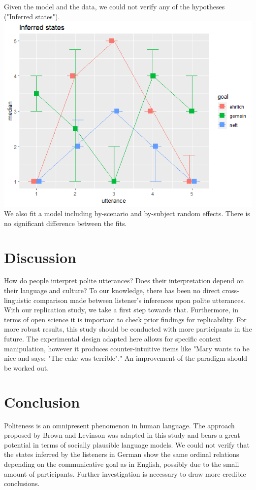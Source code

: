 \documentclass[a4paper,11pt]{article}
\begin{document}
Given the model and the data, we could not verify any of the hypotheses ("Inferred states").
\\
\includegraphics[width=15cm]{final_report/inferred-states.png} 
\\
We also fit a model including by-scenario and by-subject random effects. There is no significant difference between the fits.

\section{Discussion}
How do people interpret polite utterances? Does their interpretation depend on their language and culture? To our knowledge, there has been no direct cross-linguistic comparison made between listener's inferences upon polite utterances. With our replication study, we take a first step towards that. Furthermore, in terms of open science it is important to check prior findings for replicability. For more robust results, this study should be conducted with more participants in the future. The experimental design adapted here allows for specific context manipulation, however it produces counter-intuitive items like "Mary wants to be nice and says: "The cake was terrible"." An improvement of the paradigm should be worked out. 
\section{Conclusion}
Politeness is an omnipresent phenomenon in human language. The approach proposed by Brown and Levinson \cite{brown1987politeness} was adapted in this study and bears a great potential in terms of socially plausible language models. We could not verify that the states inferred by the listeners in German show the same ordinal relations depending on the communicative goal as in English, possibly due to the small amount of participants. Further investigation is necessary to draw more credible conclusions. 


\end{document}
